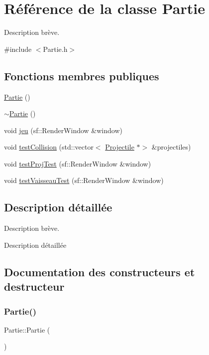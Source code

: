 \hypertarget{class_partie}{}\section{Référence de la classe Partie}
\label{class_partie}


Description brève.  




{\ttfamily \#include $<$Partie.\+h$>$}

\subsection*{Fonctions membres publiques}
\begin{DoxyCompactItemize}
\item 
\hyperlink{class_partie_ae40831aad10fc4a391295e2ea1447b5a}{Partie} ()
\item 
\hyperlink{class_partie_ae4afeb7336bb84427272cfb7018b5e3d}{$\sim$\+Partie} ()
\item 
void \hyperlink{class_partie_afc91237df57c01383e558ef0cb127501}{jeu} (sf\+::\+Render\+Window \&window)
\item 
void \hyperlink{class_partie_aae0457a6d531a2c2da83463a7fa66574}{test\+Collision} (std\+::vector$<$ \hyperlink{class_projectile}{Projectile} $\ast$$>$ \&projectiles)
\item 
void \hyperlink{class_partie_aed9448d53e259a2b90dc371b0a02efae}{test\+Proj\+Test} (sf\+::\+Render\+Window \&window)
\item 
void \hyperlink{class_partie_ae1876425c48ff2c9426b3971309f29c3}{test\+Vaisseau\+Test} (sf\+::\+Render\+Window \&window)
\end{DoxyCompactItemize}


\subsection{Description détaillée}
Description brève. 

Description détaillée 

\subsection{Documentation des constructeurs et destructeur}
\mbox{\label{class_partie_ae40831aad10fc4a391295e2ea1447b5a}} 
\subsubsection{\texorpdfstring{Partie()}{Partie()}}
{\footnotesize\ttfamily Partie\+::\+Partie (\begin{DoxyParamCaption}{ }\end{DoxyParamCaption})}

